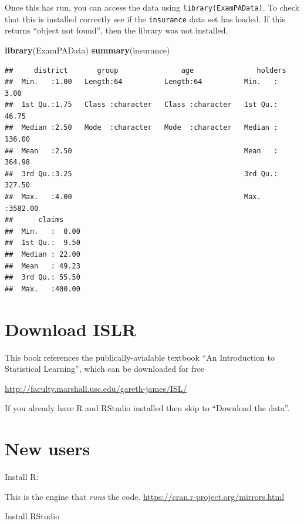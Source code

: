 \documentclass[openany]{book}
\newenvironment{Shaded}{\begin{snugshade}}{\end{snugshade}}
\newcommand{\KeywordTok}[1]{\textcolor[rgb]{0.13,0.29,0.53}{\textbf{#1}}}
\newcommand{\NormalTok}[1]{#1}
\begin{document}
Once this has run, you can access the data using \texttt{library(ExamPAData)}. To check that this is installed correctly see if the \texttt{insurance} data set has loaded. If this returns ``object not found'', then the library was not installed.

\begin{Shaded}
\begin{Highlighting}[]
\KeywordTok{library}\NormalTok{(ExamPAData)}
\KeywordTok{summary}\NormalTok{(insurance)}
\end{Highlighting}
\end{Shaded}

\begin{verbatim}
##     district       group               age               holders       
##  Min.   :1.00   Length:64          Length:64          Min.   :   3.00  
##  1st Qu.:1.75   Class :character   Class :character   1st Qu.:  46.75  
##  Median :2.50   Mode  :character   Mode  :character   Median : 136.00  
##  Mean   :2.50                                         Mean   : 364.98  
##  3rd Qu.:3.25                                         3rd Qu.: 327.50  
##  Max.   :4.00                                         Max.   :3582.00  
##      claims      
##  Min.   :  0.00  
##  1st Qu.:  9.50  
##  Median : 22.00  
##  Mean   : 49.23  
##  3rd Qu.: 55.50  
##  Max.   :400.00
\end{verbatim}

\hypertarget{download-islr}{%
\section{Download ISLR}\label{download-islr}}

This book references the publically-avialable textbook ``An Introduction to Statistical Learning'', which can be downloaded for free

\url{http://faculty.marshall.usc.edu/gareth-james/ISL/}

If you already have R and RStudio installed then skip to ``Download the data''.

\hypertarget{new-users}{%
\section{New users}\label{new-users}}

Install R:

This is the engine that \emph{runs} the code. \url{https://cran.r-project.org/mirrors.html}

Install RStudio
\end{document}
